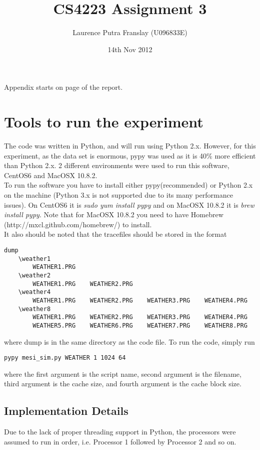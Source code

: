 \documentclass[]{article}
\begin{document}
\title{CS4223 Assignment 3}
\author{Laurence Putra Franslay (U096833E)}
\date{14th Nov 2012}
\maketitle

Appendix starts on page \pageref{sec:appendix_start} of the report.\\

\section{Tools to run the experiment}
The code was written in Python, and will run using Python 2.x. However, for this experiment, as the data set is enormous, pypy was used as it is 40\% more efficient than Python 2.x. 2 different environments were used to run this software, CentOS6 and MacOSX 10.8.2.\\

To run the software you have to install either pypy(recommended) or Python 2.x on the machine (Python 3.x is not supported due to its many performance issues). On CentOS6 it is \emph{sudo yum install pypy} and on MacOSX 10.8.2 it is \emph{brew install pypy}. Note that for MacOSX 10.8.2 you need to have Homebrew (http://mxcl.github.com/homebrew/) to install.\\

It also should be noted that the tracefiles should be stored in the format 
\begin{verbatim}
dump
    \weather1
        WEATHER1.PRG
    \weather2
        WEATHER1.PRG    WEATHER2.PRG
    \weather4
        WEATHER1.PRG    WEATHER2.PRG    WEATHER3.PRG    WEATHER4.PRG
    \weather8
        WEATHER1.PRG    WEATHER2.PRG    WEATHER3.PRG    WEATHER4.PRG
        WEATHER5.PRG    WEATHER6.PRG    WEATHER7.PRG    WEATHER8.PRG
\end{verbatim}
where dump is in the same directory as the code file. To run the code, simply run
\begin{lstlisting}
pypy mesi_sim.py WEATHER 1 1024 64
\end{lstlisting}
where the first argument is the script name, second argument is the filename, third argument is the cache size, and fourth argument is the cache block size.\\

\subsection{Implementation Details}
Due to the lack of proper threading support in Python, the processors were assumed to run in order, i.e. Processor 1 followed by Processor 2 and so on.\\
\end{document}

